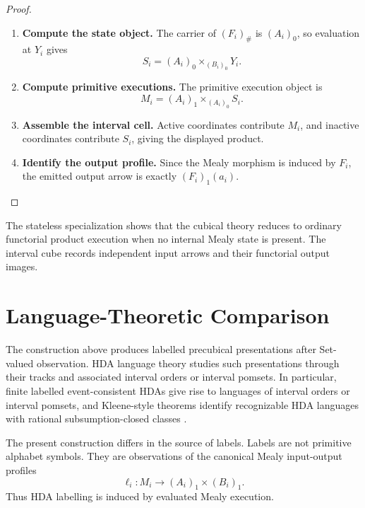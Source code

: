 \begin{proof}
    \leavevmode
    \begin{enumerate}
        \item \textbf{Compute the state object.}
        The carrier of \((F_i)_\#\) is \((A_i)_0\), so evaluation at \(Y_i\)
        gives
        \[
            S_i=(A_i)_0\times_{(B_i)_0}Y_i.
        \]

        \item \textbf{Compute primitive executions.}
        The primitive execution object is
        \[
            M_i=(A_i)_1\times_{(A_i)_0}S_i.
        \]

        \item \textbf{Assemble the interval cell.}
        Active coordinates contribute \(M_i\), and inactive coordinates
        contribute \(S_i\), giving the displayed product.

        \item \textbf{Identify the output profile.}
        Since the Mealy morphism is induced by \(F_i\), the emitted output
        arrow is exactly \((F_i)_1(a_i)\).
    \end{enumerate}
\end{proof}

\begin{remark}
\label{rem:cmett-stateless-functorial-execution}
    The stateless specialization shows that the cubical theory reduces to
    ordinary functorial product execution when no internal Mealy state is
    present. The interval cube records independent input arrows and their
    functorial output images.
\end{remark}

\section{Language-Theoretic Comparison}
\label{sec:cmett-language-theoretic-comparison}

The construction above produces labelled precubical presentations after
Set-valued observation. HDA language theory studies such presentations
through their tracks and associated interval orders or interval pomsets. In
particular, finite labelled event-consistent HDAs give rise to languages of
interval orders or interval pomsets, and Kleene-style theorems identify
recognizable HDA languages with rational subsumption-closed classes
\cite{FahrenbergJohansenStruthZiemianski2021,Fahrenberg_2024}.

The present construction differs in the source of labels. Labels are not
primitive alphabet symbols. They are observations of the canonical Mealy
input-output profiles
\[
    \ell_i:M_i\to(A_i)_1\times(B_i)_1.
\]
Thus HDA labelling is induced by evaluated Mealy execution.

